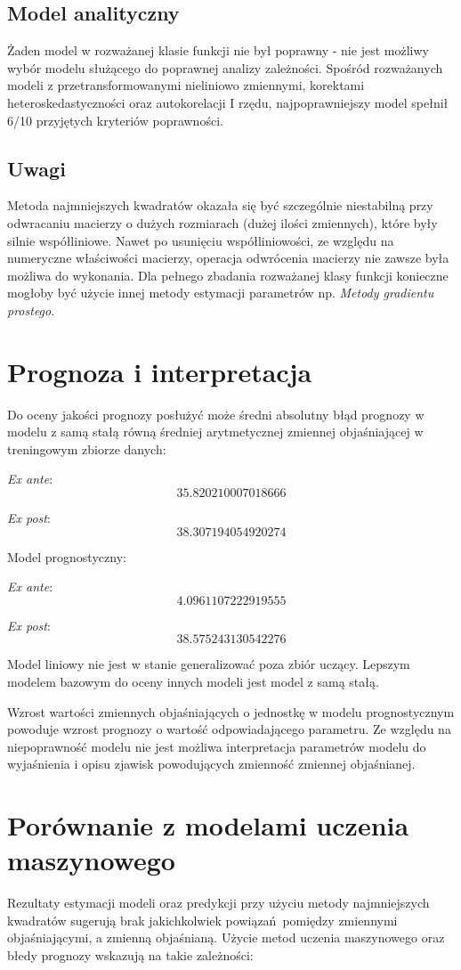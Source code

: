 \documentclass{article}
\begin{document}
\subsection{Model analityczny}
Żaden model w rozważanej klasie funkcji nie był poprawny - nie jest możliwy wybór modelu służącego do poprawnej analizy zależności. Spośród rozważanych modeli z przetransformowanymi nieliniowo zmiennymi, korektami heteroskedastyczności oraz autokorelacji I rzędu, najpoprawniejszy model spełnił 6/10 przyjętych kryteriów poprawności.

\subsection{Uwagi}
Metoda najmniejszych kwadratów okazała się być szczególnie niestabilną przy odwracaniu macierzy o dużych rozmiarach (dużej ilości zmiennych), które były silnie współliniowe. Nawet po usunięciu współliniowości, ze względu na numeryczne właściwości macierzy, operacja odwrócenia macierzy nie zawsze była możliwa do wykonania. Dla pełnego zbadania rozważanej klasy funkcji konieczne mogłoby być użycie innej metody estymacji parametrów np. \textit{Metody gradientu prostego}.

\section{Prognoza i interpretacja}
Do oceny jakości prognozy posłużyć może średni absolutny błąd prognozy w modelu z samą stałą równą średniej arytmetycznej zmiennej objaśniającej w treningowym zbiorze danych:

\textit{Ex ante}:
\[35.820210007018666\]

\textit{Ex post}:
\[38.307194054920274\]

Model prognostyczny:

\textit{Ex ante}:
\[4.0961107222919555\]

\textit{Ex post}:
\[38.575243130542276\]

Model liniowy nie jest w stanie generalizować poza zbiór uczący. Lepszym modelem bazowym do oceny innych modeli jest model z samą stałą.

Wzrost wartości zmiennych objaśniających o jednostkę w modelu prognostycznym powoduje wzrost prognozy o wartość odpowiadającego parametru. Ze względu na niepoprawność modelu nie jest możliwa interpretacja parametrów modelu do wyjaśnienia i opisu zjawisk powodujących zmienność zmiennej objaśnianej. 

\newpage
\section{Porównanie z modelami uczenia maszynowego}
Rezultaty estymacji modeli oraz predykcji przy użyciu metody najmniejszych kwadratów sugerują brak jakichkolwiek powiązań pomiędzy zmiennymi objaśniającymi, a zmienną objaśnianą. Użycie metod uczenia maszynowego oraz błedy prognozy wskazują na takie zależności:
\end{document}
